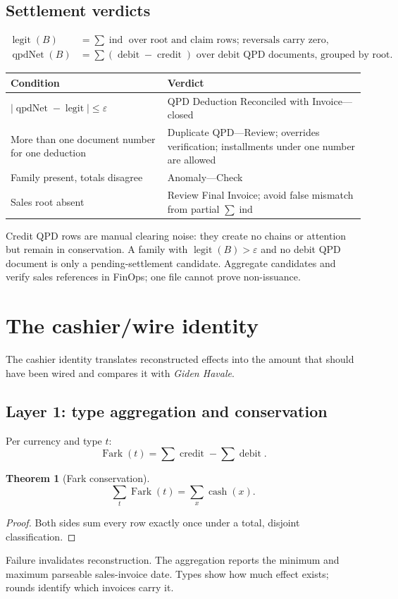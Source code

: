 \documentclass[11pt,a4paper]{article}
\newcommand{\eps}{\varepsilon}
\newcommand{\cash}{\operatorname{cash}}
\newcommand{\ind}{\operatorname{ind}}
\newtheorem{theorem}{Theorem}
\theoremstyle{definition}
\begin{document}
\subsection{Settlement verdicts}
\begin{align*}
\operatorname{legit}(B)&=\sum\ind\text{ over root and claim rows;
reversals carry zero},\\
\operatorname{qpdNet}(B)&=\sum(\operatorname{debit}-
\operatorname{credit})\text{ over debit QPD documents, grouped by root}.
\end{align*}
\begin{center}
\begin{tabularx}{\textwidth}{@{}p{}X@{}}
\toprule
\textbf{Condition} & \textbf{Verdict}\\
\midrule
$|\operatorname{qpdNet}-\operatorname{legit}|\le\eps$ & QPD Deduction Reconciled with Invoice---closed\\
More than one document number for one deduction & Duplicate QPD---Review; overrides verification; installments under one number are allowed\\
Family present, totals disagree & Anomaly---Check\\
Sales root absent & Review Final Invoice; avoid false mismatch from partial $\sum\ind$\\
\bottomrule
\end{tabularx}
\end{center}
Credit QPD rows are manual clearing noise: they create no chains or
attention but remain in conservation. A family with
$\operatorname{legit}(B)>\eps$ and no debit QPD document is only a
pending-settlement candidate. Aggregate candidates and verify sales
references in FinOps; one file cannot prove non-issuance.

\section{The cashier/wire identity}
The cashier identity translates reconstructed effects into the amount
that should have been wired and compares it with \emph{Giden Havale}.

\subsection{Layer 1: type aggregation and conservation}
Per currency and type $t$:
\[
\operatorname{Fark}(t)=\sum\operatorname{credit}-
\sum\operatorname{debit}.
\]
\begin{theorem}[Fark conservation]
\[
\sum_t\operatorname{Fark}(t)=\sum_x\cash(x).
\]
\end{theorem}
\begin{proof}
Both sides sum every row exactly once under a total, disjoint
classification.
\end{proof}
Failure invalidates reconstruction. The aggregation reports the minimum
and maximum parseable sales-invoice date. Types show how much effect
exists; rounds identify which invoices carry it.
\end{document}
